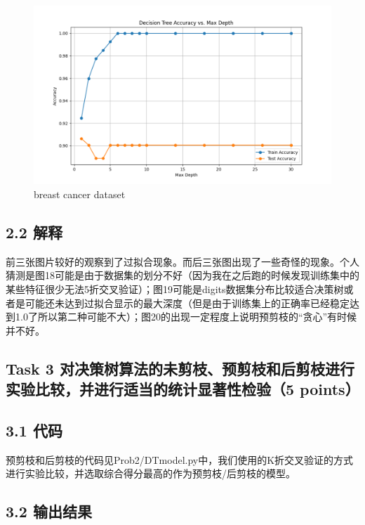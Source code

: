 \documentclass[8pt]{article}
\begin{document}
\begin{figure}[H]
\begin{minipage}{0.32\textwidth}
        \includegraphics[width=\textwidth]{../Prob2/out/task2/cancer/AccuracyVsMaxDepth_30.png}
        \caption{breast cancer dataset}
        \label{fig:AccuracyVsMaxDepth_30 on breast cancer dataset}
    \end{minipage}
\end{figure}

\subsection*{2.2 解释}

前三张图片较好的观察到了过拟合现象。而后三张图出现了一些奇怪的现象。个人猜测是图18可能是由于数据集的划分不好（因为我在之后跑的时候发现训练集中的某些特征很少无法5折交叉验证）；图19可能是digits数据集分布比较适合决策树或者是可能还未达到过拟合显示的最大深度（但是由于训练集上的正确率已经稳定达到1.0了所以第二种可能不大）；图20的出现一定程度上说明预剪枝的“贪心”有时候并不好。

\subsection*{Task 3 对决策树算法的未剪枝、预剪枝和后剪枝进行实验比较，并进行适当的统计显著性检验（5 points）} 

\subsection*{3.1 代码}

预剪枝和后剪枝的代码见Prob2/DTmodel.py中，我们使用的K折交叉验证的方式进行实验比较，并选取综合得分最高的作为预剪枝/后剪枝的模型。

\subsection*{3.2 输出结果}
\end{document}
